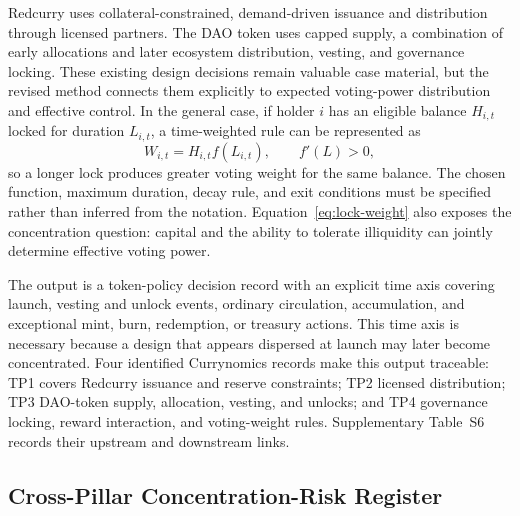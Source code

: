 \documentclass[referee,sn-basic]{sn-jnl}
\begin{document}
Redcurry uses collateral-constrained, demand-driven issuance and distribution
through licensed partners. The DAO token uses capped supply, a combination of
early allocations and later ecosystem distribution, vesting, and governance
locking. These existing design decisions remain valuable case material, but
the revised method connects them explicitly to expected voting-power
distribution and effective control. In the general case, if holder $i$ has an
eligible balance $H_{i,t}$ locked for duration $L_{i,t}$, a time-weighted rule
can be represented as
\begin{equation}\label{eq:lock-weight}
W_{i,t}=H_{i,t}f(L_{i,t}),\qquad f'(L)>0,
\end{equation}
so a longer lock produces greater voting weight for the same balance. The
chosen function, maximum duration, decay rule, and exit conditions must be
specified rather than inferred from the notation. Equation~\eqref{eq:lock-weight}
also exposes the concentration question: capital and the ability to tolerate
illiquidity can jointly determine effective voting power.

The output is a token-policy decision record with an explicit time axis
covering launch, vesting and unlock events, ordinary circulation, accumulation,
and exceptional mint, burn, redemption, or treasury actions. This time axis is
necessary because a design that appears dispersed at launch may later become
concentrated. Four identified Currynomics records make this output traceable:
TP1 covers Redcurry issuance and reserve constraints; TP2 licensed distribution;
TP3 DAO-token supply, allocation, vesting, and unlocks; and TP4 governance
locking, reward interaction, and voting-weight rules. Supplementary Table~S6
records their upstream and downstream links.

\subsection{Cross-Pillar Concentration-Risk Register}\label{subsec:risk-register}
\end{document}
